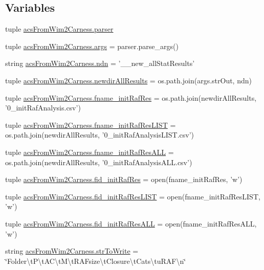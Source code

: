 \subsection*{Variables}
\begin{DoxyCompactItemize}
\item 
tuple \hyperlink{a00100_aed93287ef2c9a4a9ba68f8ffc75aae17}{acs\-From\-Wim2\-Carness.\-parser}
\item 
tuple \hyperlink{a00100_ac4c461267ee7f11bbe525de64f56cd10}{acs\-From\-Wim2\-Carness.\-args} = parser.\-parse\-\_\-args()
\item 
string \hyperlink{a00100_a6f995419ddd7f2de58506d9541238dbc}{acs\-From\-Wim2\-Carness.\-ndn} = '\-\_\-\_\-new\-\_\-all\-Stat\-Results'
\item 
tuple \hyperlink{a00100_a4af2fb5abbd4a6e8930401e66af5b79d}{acs\-From\-Wim2\-Carness.\-newdir\-All\-Results} = os.\-path.\-join(args.\-str\-Out, ndn)
\item 
tuple \hyperlink{a00100_a6df9226d812c675c76a936c215c07e53}{acs\-From\-Wim2\-Carness.\-fname\-\_\-init\-Raf\-Res} = os.\-path.\-join(newdir\-All\-Results, '0\-\_\-init\-Raf\-Analysis.\-csv')
\item 
tuple \hyperlink{a00100_a69f06c42408f8a1ae74e34daa83402b7}{acs\-From\-Wim2\-Carness.\-fname\-\_\-init\-Raf\-Res\-L\-I\-S\-T} = os.\-path.\-join(newdir\-All\-Results, '0\-\_\-init\-Raf\-Analysis\-L\-I\-S\-T.\-csv')
\item 
tuple \hyperlink{a00100_a89c98e628d7938077b4ed18215d4fd9b}{acs\-From\-Wim2\-Carness.\-fname\-\_\-init\-Raf\-Res\-A\-L\-L} = os.\-path.\-join(newdir\-All\-Results, '0\-\_\-init\-Raf\-Analysis\-A\-L\-L.\-csv')
\item 
tuple \hyperlink{a00100_a2f9cfe05abfed3ab6326d0cb094c7c80}{acs\-From\-Wim2\-Carness.\-fid\-\_\-init\-Raf\-Res} = open(fname\-\_\-init\-Raf\-Res, 'w')
\item 
tuple \hyperlink{a00100_a7af2668de12720f3c7925527002d81b0}{acs\-From\-Wim2\-Carness.\-fid\-\_\-init\-Raf\-Res\-L\-I\-S\-T} = open(fname\-\_\-init\-Raf\-Res\-L\-I\-S\-T, 'w')
\item 
tuple \hyperlink{a00100_add1c3bb75f1d98889c27099fc14fc6a8}{acs\-From\-Wim2\-Carness.\-fid\-\_\-init\-Raf\-Res\-A\-L\-L} = open(fname\-\_\-init\-Raf\-Res\-A\-L\-L, 'w')
\item 
string \hyperlink{a00100_a34b3667c3c217a35a0e9b71458d2b233}{acs\-From\-Wim2\-Carness.\-str\-To\-Write} = \char`\"{}Folder\textbackslash{}t\-P\textbackslash{}t\-A\-C\textbackslash{}t\-M\textbackslash{}t\-R\-A\-Fsize\textbackslash{}t\-Closure\textbackslash{}t\-Cats\textbackslash{}tu\-R\-A\-F\textbackslash{}n\char`\"{}

\end{DoxyCompactItemize}
